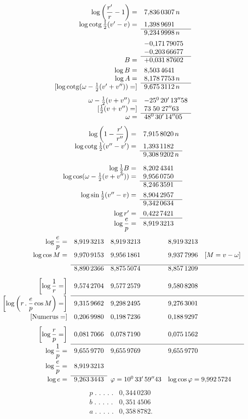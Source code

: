 \[
\begin{array}{rl}
\log\left(\dfrac{r'}r-1\right)=&7{,}836\,0307\,n\\[3pt]
\log\operatorname{cotg}\tfrac12(v'-v)=&1{,}398\,9691\\\cline{2-2}
&9{,}234\,9998\,n\\[4pt]
&-0{,}171\,79075\\
&-0{,}203\,66677\\\cline{2-2}
B=&+0{,}031\,87602\\[3pt]
\log B=&8{,}503\,4641\\
\log A=&8{,}178\,7753\,n\\\cline{2-2}
{}[\log\operatorname{cotg}(\omega-\tfrac12(v'+v''))=]&9{,}675\,3112\,n\\[8pt]
\omega-\tfrac12(v+v'')=&-25^0\,20'\,13''58\\
{}[\tfrac12(v+v'')=]&73\;50\;27''63\\\cline{2-2}
\omega=&48^0\,30'\,14''05
\end{array}
\]
\[
\begin{array}{rl}
\log\left(1-\dfrac{r'}{r''}\right)=&7{,}915\,8020\,n\\[3pt]
\log\operatorname{cotg}\tfrac12(v''-v')=&1{,}393\,1182\\\cline{2-2}
&9{,}308\,9202\,n\\[8pt]
\log\tfrac12 B=&8{,}202\,4341\\
\log\cos(\omega-\tfrac12(v+v''))=&9{,}956\,0750\\\cline{2-2}
&8{,}246\,3591\\[3pt]
\log\sin\tfrac12(v''-v)=&8{,}904\,2957\\\cline{2-2}
&9{,}342\,0634\\[3pt]
\log r'=&0{,}422\,7421\\\cline{2-2}
\log\dfrac ep=&8{,}919\,3213
\end{array}
\]
\clearpage
{}
\noindent{\small [S. 11]}
{\footnotesize\setlength{\arraycolsep}{3pt}
\[
\begin{array}{rlll}
\log\dfrac ep=&8{,}919\,3213&8{,}919\,3213&8{,}919\,3213\\[8pt]
\log\cos M=&9{,}970\,9153&9{,}956\,1861&9{,}937\,7996\quad[M=v-\omega]\\[8pt]\cline{2-4}
&8{,}890\,2366&8{,}875\,5074&8{,}857\,1209\\[8pt]
{}\left[\log\dfrac1r=\right]&9{,}574\,2704&9{,}577\,2579&9{,}580\,8208\\[8pt]\cline{2-4}
{}\left[\log\left(r\mathbin{.}\dfrac ep\cos M\right)=\right]&9{,}315\,9662&9{,}298\,2495&9{,}276\,3001\\[8pt]
{}[\text{Numerus}=]&0{,}206\,9980&0{,}198\,7236&0{,}188\,9297\\[8pt]
{}\left[\log\dfrac rp=\right]&0{,}081\,7066&0{,}078\,7190&0{,}075\,1562\\[8pt]\cline{2-4}
\log\dfrac1p=&9{,}655\,9770&9{,}655\,9769&9{,}655\,9770\\[8pt]
\log\dfrac ep=&8{,}919\,3213&&\\[8pt]\cline{2-2}
\log e=&9{,}263\,3443&\varphi=10^0\,33'\,59''43&\log\cos\varphi=9{,}992\,5724
\end{array}
\]}
\[
\begin{array}{rl}
p\;\text{. . . . .}&0{,}344\,0230\\
b\;\text{. . . . .}&0{,}351\,4506\\
a\;\text{. . . . .}&0{,}358\,8782.
\end{array}
\]
\clearpage
\endgroup
